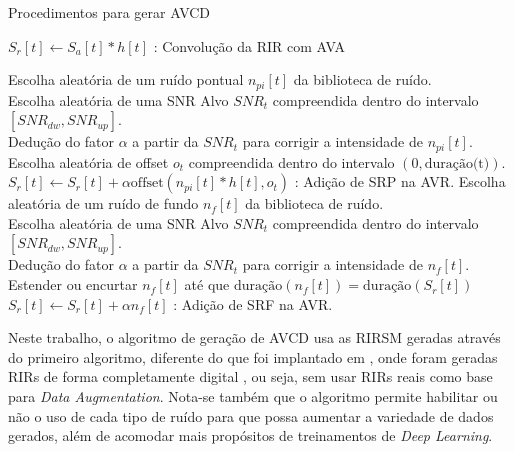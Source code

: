 \begin{algorithm} [H] 
    \caption{Procedimentos para gerar AVCD}
    \label{alg:AVCD-gen}


    $S_r[t] \gets S_a[t] \ast h[t]$ : Convolução da RIR com AVA

    {
        {
            Escolha aleatória de um ruído pontual $n_{pi}[t]$ da biblioteca de ruído. \\
            Escolha aleatória de uma SNR Alvo $SNR_t$ compreendida dentro do intervalo $[SNR_{dw},SNR_{up}]$. \\
            Dedução do fator $\alpha$ a partir da $SNR_t$ para corrigir a intensidade de $n_{pi}[t]$. \\
            Escolha aleatória de offset $o_t$ compreendida dentro do intervalo $(0,\text{duração(t)})$. \\
            $S_r[t] \gets S_r[t] + \alpha \text{offset}(n_{pi}[t] \ast h[t], o_t)$ : Adição de SRP na AVR.
        }
    }
    {
        Escolha aleatória de um ruído de fundo $n_f[t]$ da biblioteca de ruído. \\
        Escolha aleatória de uma SNR Alvo $SNR_t$ compreendida dentro do intervalo $[SNR_{dw},SNR_{up}]$. \\
        Dedução do fator $\alpha$ a partir da $SNR_t$ para corrigir a intensidade de $n_f[t]$. \\
        Estender ou encurtar $n_f[t]$ até que $\text{duração}(n_f[t]) = \text{duração}(S_r[t])$
        $S_r[t] \gets S_r[t] + \alpha n_f[t]$ : Adição de SRF na AVR.
    }

\end{algorithm}
\pagebreak


Neste trabalho, o algoritmo de geração de AVCD usa as RIRSM geradas através do primeiro algoritmo, diferente do que foi implantado
em \cite{Speech_Rec}, onde foram geradas RIRs de forma completamente digital \cite{RIR_sim_image}, ou seja, sem usar RIRs reais 
como base para \textit{Data Augmentation}.
Nota-se também que o algoritmo permite habilitar ou não o uso de cada tipo de ruído para que possa aumentar a variedade de dados gerados, além
de acomodar mais propósitos de treinamentos de \textit{Deep Learning}.


